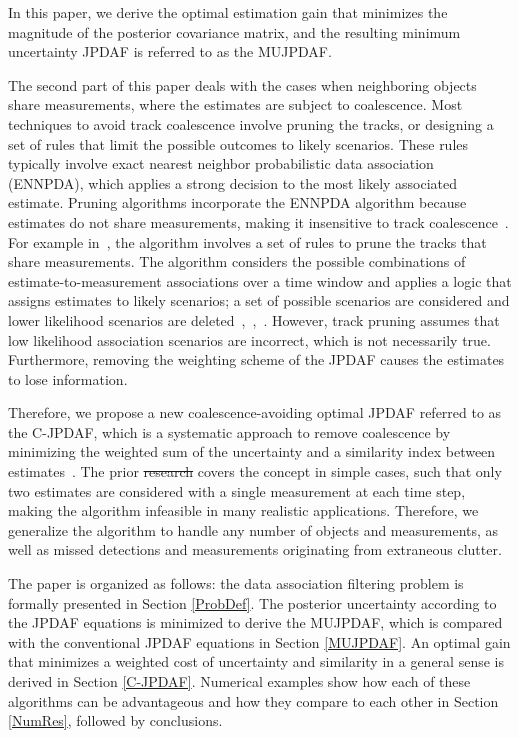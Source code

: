 \documentclass[letterpaper, 10pt, conference]{ieeeconf}
\providecommand{\DIFadd}[1]{{\protect\color{blue}\uwave{#1}}} %
\providecommand{\DIFdel}[1]{{\protect\color{red}\sout{#1}}}                      %
\providecommand{\DIFaddbegin}{} %
\providecommand{\DIFaddend}{} %
\providecommand{\DIFdelbegin}{} %
\providecommand{\DIFdelend}{} %
\begin{document}
\DIFaddend In this paper, we derive the optimal estimation gain that minimizes the magnitude of the posterior covariance matrix, and the resulting minimum uncertainty JPDAF is referred to as the MUJPDAF.

The second part of this paper deals with the cases when neighboring objects share measurements, where the estimates are subject to coalescence.
Most techniques to avoid track coalescence involve pruning the tracks, or designing a set of rules that limit the possible outcomes to likely scenarios. These rules typically involve exact nearest neighbor probabilistic data association (ENNPDA), which applies a strong decision to the most likely associated estimate. Pruning algorithms incorporate the ENNPDA algorithm because  estimates do not share measurements, making it insensitive to track coalescence~\cite{Coal1}.
For example in~\cite{Fitzgerald}, the algorithm involves a set of rules to prune the tracks that share measurements.
The algorithm considers the possible combinations of estimate-to-measurement associations over a time window and applies a logic that assigns estimates to likely scenarios; a set of possible scenarios are considered and lower likelihood scenarios are deleted~\cite{Coal_d},~\cite{Coal_e},~\cite{Coal_c}.
However, track pruning assumes that low likelihood association scenarios are incorrect, which is not necessarily true.
Furthermore, removing the weighting scheme of the JPDAF causes the estimates to lose information.

Therefore, we propose a new coalescence-avoiding optimal JPDAF referred to as the C-JPDAF, which is a systematic approach to remove coalescence by minimizing the weighted sum of the uncertainty and a similarity index between estimates~\cite{KauLovLee14}.
The prior \DIFdelbegin \DIFdel{research }\DIFdelend \DIFaddbegin \DIFadd{work }\DIFaddend covers the concept in simple cases, such that only two estimates are considered with a single measurement at each time step, making the algorithm infeasible in many realistic applications.
Therefore, we generalize the algorithm to handle any number of objects and measurements, as well as missed detections and measurements originating from extraneous clutter.

The paper is organized as follows: the data association filtering problem is formally presented in Section \ref{ProbDef}.
The posterior uncertainty according to the JPDAF equations is minimized to derive the MUJPDAF, which is compared with the conventional JPDAF equations in Section \ref{MUJPDAF}.
An optimal gain that minimizes a weighted cost of uncertainty and similarity in a general sense is derived in Section \ref{C-JPDAF}.
Numerical examples show how each of these algorithms can be advantageous and how they compare to each other in Section \ref{NumRes}, followed by conclusions.
\end{document}
